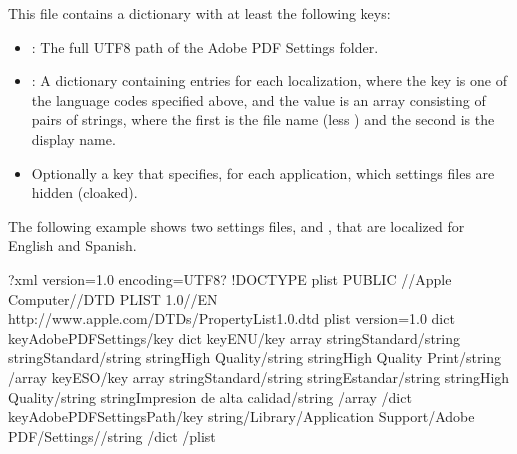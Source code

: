 \documentclass[letterpaper,12pt,english,openany,oneside]{sphinxmanual}
\begin{document}
This file contains a dictionary with at least the following keys:
\begin{itemize}
\item {} 
 : The full UTF\sphinxhyphen{}8 path of the Adobe PDF Settings folder.

\item {} 
 : A dictionary containing entries for each localization, where the key is one of the language codes specified above, and the value is an array consisting of pairs of strings, where the first is the file name (less  ) and the second is the display name.

\item {} 
Optionally a  key that specifies, for each application, which settings files are hidden (cloaked).

\end{itemize}

The following example shows two settings files,  and  , that are localized for English and Spanish.

\begin{sphinxVerbatim}[commandchars=\\\{\}]
\PYGZlt{}?xml version=\PYGZdq{}1.0\PYGZdq{} encoding=\PYGZdq{}UTF\PYGZhy{}8\PYGZdq{}?\PYGZgt{}
 \PYGZlt{}!DOCTYPE plist PUBLIC \PYGZdq{}\PYGZhy{}//Apple Computer//DTD PLIST 1.0//EN\PYGZdq{}
         \PYGZdq{}http://www.apple.com/DTDs/PropertyList\PYGZhy{}1.0.dtd\PYGZdq{}\PYGZgt{}
 \PYGZlt{}plist version=\PYGZdq{}1.0\PYGZdq{}\PYGZgt{}
 \PYGZlt{}dict\PYGZgt{}
         \PYGZlt{}key\PYGZgt{}AdobePDFSettings\PYGZlt{}/key\PYGZgt{}
         \PYGZlt{}dict\PYGZgt{}
                 \PYGZlt{}key\PYGZgt{}ENU\PYGZlt{}/key\PYGZgt{}
                 \PYGZlt{}array\PYGZgt{}
                         \PYGZlt{}string\PYGZgt{}Standard\PYGZlt{}/string\PYGZgt{}
                         \PYGZlt{}string\PYGZgt{}Standard\PYGZlt{}/string\PYGZgt{}
                         \PYGZlt{}string\PYGZgt{}High Quality\PYGZlt{}/string\PYGZgt{}
                         \PYGZlt{}string\PYGZgt{}High Quality Print\PYGZlt{}/string\PYGZgt{}
                 \PYGZlt{}/array\PYGZgt{}
                 \PYGZlt{}key\PYGZgt{}ESO\PYGZlt{}/key\PYGZgt{}
                 \PYGZlt{}array\PYGZgt{}
                         \PYGZlt{}string\PYGZgt{}Standard\PYGZlt{}/string\PYGZgt{}
                         \PYGZlt{}string\PYGZgt{}Estandar\PYGZlt{}/string\PYGZgt{}
                         \PYGZlt{}string\PYGZgt{}High Quality\PYGZlt{}/string\PYGZgt{}
                         \PYGZlt{}string\PYGZgt{}Impresion de alta calidad\PYGZlt{}/string\PYGZgt{}
                 \PYGZlt{}/array\PYGZgt{}
         \PYGZlt{}/dict\PYGZgt{}
         key\PYGZgt{}AdobePDFSettingsPath\PYGZlt{}/key\PYGZgt{}
         \PYGZlt{}string\PYGZgt{}/Library/Application Support/Adobe PDF/Settings/\PYGZlt{}/string\PYGZgt{}
 \PYGZlt{}/dict\PYGZgt{}
 \PYGZlt{}/plist\PYGZgt{}
\end{sphinxVerbatim}
\end{document}
